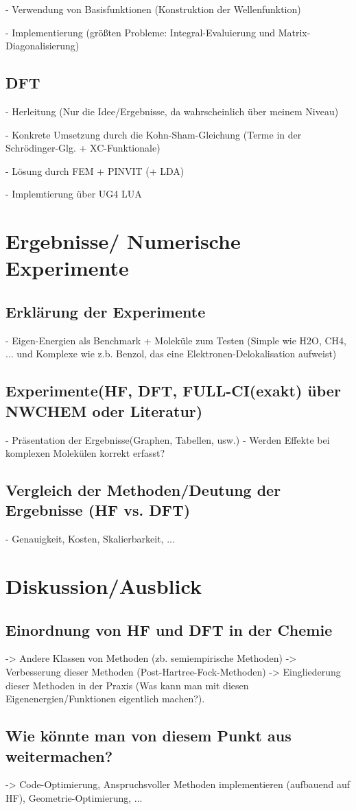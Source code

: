 \documentclass[a4paper, 12pt]{report}
\begin{document}
- Verwendung von Basisfunktionen (Konstruktion der Wellenfunktion)

- Implementierung (größten Probleme: Integral-Evaluierung und
Matrix-Diagonalisierung)

\section{DFT}
- Herleitung (Nur die Idee/Ergebnisse, da wahrscheinlich über
meinem Niveau)

- Konkrete Umsetzung durch die Kohn-Sham-Gleichung (Terme in der
Schrödinger-Glg. + XC-Funktionale)

- Lösung durch FEM + PINVIT (+ LDA)

- Implemtierung über UG4 LUA

\chapter{Ergebnisse/ Numerische Experimente}
\section{Erklärung der Experimente}
- Eigen-Energien als Benchmark + Moleküle zum Testen (Simple wie
H2O, CH4, ... und Komplexe wie z.b. Benzol, das eine
Elektronen-Delokalisation aufweist)

\section{Experimente(HF, DFT, FULL-CI(exakt) über NWCHEM oder Literatur)}
- Präsentation der Ergebnisse(Graphen, Tabellen, usw.)
- Werden Effekte bei komplexen Molekülen korrekt erfasst?

\section{Vergleich der Methoden/Deutung der Ergebnisse (HF vs. DFT)}
- Genauigkeit, Kosten, Skalierbarkeit, ...

\chapter{Diskussion/Ausblick}
\section{Einordnung von HF und DFT in der Chemie}
-> Andere Klassen von Methoden (zb. semiempirische Methoden)
-> Verbesserung dieser Methoden (Post-Hartree-Fock-Methoden)
-> Eingliederung dieser Methoden in der Praxis (Was kann man mit
diesen Eigenenergien/Funktionen eigentlich machen?).

\section{Wie könnte man von diesem Punkt aus weitermachen?}
-> Code-Optimierung, Anspruchsvoller Methoden implementieren
(aufbauend auf HF), Geometrie-Optimierung, ...



\end{document}
